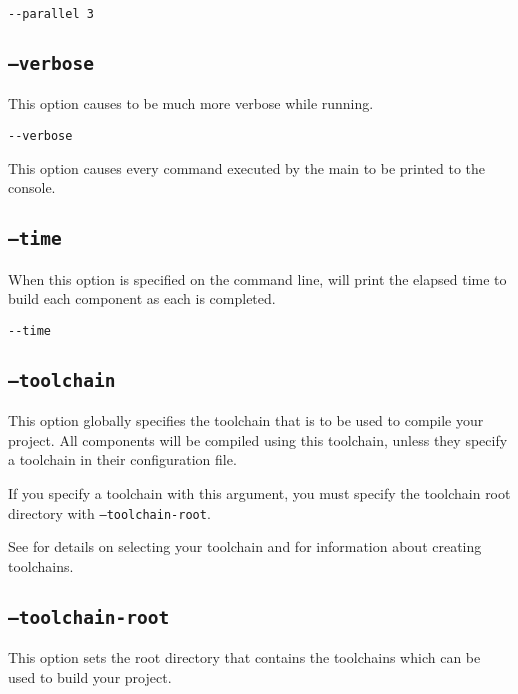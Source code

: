 \begin{verbatim}
--parallel 3
\end{verbatim}

\subsection{\texttt{--verbose}}

This option causes \lmsbw to be much more verbose while running.

\begin{verbatim}
--verbose
\end{verbatim}

This option causes every command executed by the main \makefile to be
printed to the console.

\subsection{\texttt{--time}}

When this option is specified on the command line, \lmsbw will print
the elapsed time to build each component as each is completed.

\begin{verbatim}
--time
\end{verbatim}

\subsection{\texttt{--toolchain}}\label{usinglmsbw:toolchain}

This option globally specifies the toolchain that is to be used to
compile your project.  All components will be compiled using this
toolchain, unless they specify a toolchain in their configuration
file.

If you specify a toolchain with this argument, you must specify the
toolchain root directory with \texttt{--toolchain-root}.

See  for details on selecting your
toolchain and  for information
about creating toolchains.

\subsection{\texttt{--toolchain-root}}\label{usinglmsbw:toolchain-root}

This option sets the root directory that contains the toolchains which
can be used to build your project.

